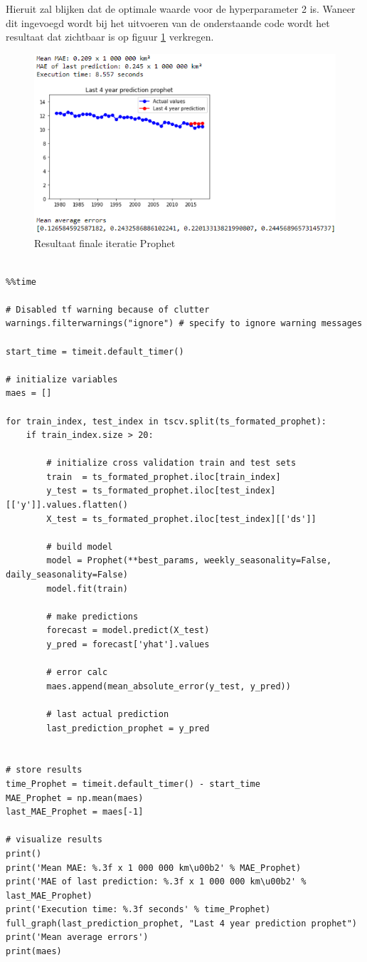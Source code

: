 Hieruit zal blijken dat de optimale waarde voor de hyperparameter 2 is. Waneer dit ingevoegd wordt bij het uitvoeren van de onderstaande code wordt het resultaat dat zichtbaar is op figuur \ref{fig:uvnsprophet} verkregen.

\begin{figure}
    \centering
    \caption{Resultaat finale iteratie Prophet}
    \label{fig:uvnsprophet}
    \includegraphics[width=0.7\linewidth]{uv_ns_prophet}
\end{figure}


\begin{verbatim}

%%time

# Disabled tf warning because of clutter
warnings.filterwarnings("ignore") # specify to ignore warning messages

start_time = timeit.default_timer()

# initialize variables
maes = []

for train_index, test_index in tscv.split(ts_formated_prophet):
    if train_index.size > 20:  
    
        # initialize cross validation train and test sets
        train  = ts_formated_prophet.iloc[train_index]
        y_test = ts_formated_prophet.iloc[test_index][['y']].values.flatten()
        X_test = ts_formated_prophet.iloc[test_index][['ds']]
        
        # build model
        model = Prophet(**best_params, weekly_seasonality=False, daily_seasonality=False)
        model.fit(train)
        
        # make predictions
        forecast = model.predict(X_test)
        y_pred = forecast['yhat'].values
        
        # error calc
        maes.append(mean_absolute_error(y_test, y_pred))
        
        # last actual prediction 
        last_prediction_prophet = y_pred


# store results
time_Prophet = timeit.default_timer() - start_time
MAE_Prophet = np.mean(maes)
last_MAE_Prophet = maes[-1]

# visualize results
print()
print('Mean MAE: %.3f x 1 000 000 km\u00b2' % MAE_Prophet)
print('MAE of last prediction: %.3f x 1 000 000 km\u00b2' % last_MAE_Prophet)
print('Execution time: %.3f seconds' % time_Prophet)
full_graph(last_prediction_prophet, "Last 4 year prediction prophet")
print('Mean average errors')
print(maes)

\end{verbatim}

